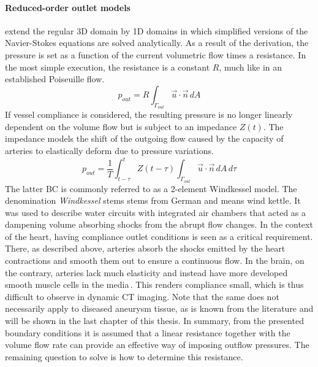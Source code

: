 \paragraph{Reduced-order outlet models} extend the regular 3D domain by 1D domains in which simplified versions of the Navier-Stokes equations are solved analytically. As a result of the derivation, the pressure is set as a function of the current volumetric flow times a resistance. In the most simple execution, the resistance is a constant $R$, much like in an established Poiseuille flow.
\begin{equation}
	p_{out} = R\int_{\Gamma_{out}} \vec{u} \cdot \vec{n}\,dA
	\label{eqn:pqr}
\end{equation}
If vessel compliance is considered, the resulting pressure is no longer linearly dependent on the volume flow but is subject to an impedance $Z(t)$. The impedance models the shift of the outgoing flow caused by the capacity of arteries to elastically deform due to pressure variations.
\begin{equation*}
	p_{out} = \frac{1}{T} \int_{t-\tau}^{t}Z(t-\tau) \int_{\Gamma_{out}} \vec{u} \cdot \vec{n}\,dA\,d\tau
\end{equation*}
The latter BC is commonly referred to as a 2-element Windkessel model. The denomination \textit{Windkessel} stems stems from German and means wind kettle. It was used to describe water circuits with integrated air chambers that acted as a dampening volume absorbing shocks from the abrupt flow changes. In the context of the heart, having compliance outlet conditions is seen as a critical requirement. There, as described above, arteries absorb the shocks emitted by the heart contractions and smooth them out to ensure a continuous flow. In the brain, on the contrary, arteries lack much elasticity and instead have more developed smooth muscle cells in the media\,\cite{Liebeskind2016}. This renders compliance small, which is thus difficult to observe in dynamic CT imaging. Note that the same does not necessarily apply to diseased aneurysm tissue, as is known from the literature and will be shown in the last chapter of this thesis. In summary, from the presented boundary conditions it is assumed that a linear resistance together with the volume flow rate can provide an effective way of imposing outflow pressures. The remaining question to solve is how to determine this resistance.

